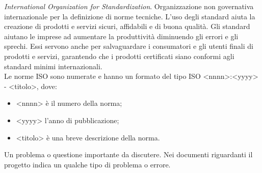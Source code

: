 \textit{International Organization for Standardization}. Organizzazione non governativa internazionale per la definizione di norme tecniche. 
L'uso degli standard aiuta la creazione di prodotti e servizi sicuri, affidabili e di buona qualità. Gli standard aiutano le imprese ad aumentare la produttività diminuendo gli errori e gli sprechi. Essi servono anche per salvaguardare i consumatori e gli utenti finali di prodotti e servizi, garantendo che i prodotti certificati siano conformi agli standard minimi internazionali. \\
Le norme ISO sono numerate e hanno un formato del tipo ISO <nnnn>:<yyyy> - <titolo>, dove:
\begin{itemize}
	\item <nnnn> è il numero della norma;
	\item <yyyy> l'anno di pubblicazione;
	\item <titolo> è una breve descrizione della norma.
\end{itemize}



Un problema o questione importante da discutere.
Nei documenti riguardanti il progetto \progetto{} indica un qualche tipo di problema o errore.



